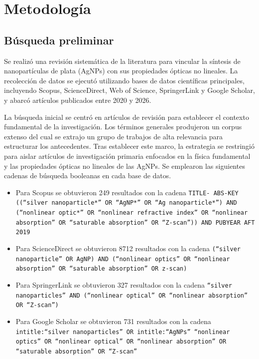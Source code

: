 \section{Metodología}

\subsection{Búsqueda preliminar}
Se realizó una revisión sistemática de la literatura para vincular la síntesis
de nanopartículas de plata (AgNPs) con sus propiedades ópticas no lineales.
La recolección de datos se ejecutó utilizando bases de datos científicas
principales, incluyendo Scopus, ScienceDirect, Web of Science, SpringerLink y
Google Scholar, y abarcó artículos publicados entre 2020 y 2026.

La búsqueda inicial se centró en artículos de revisión para establecer el
contexto fundamental de la investigación. Los términos generales produjeron un
corpus extenso del cual se extrajo un grupo de trabajos de alta relevancia para
estructurar los antecedentes. Tras establecer este marco, la estrategia se
restringió para aislar artículos de investigación primaria enfocados en la
física fundamental y las propiedades ópticas no lineales de las AgNPs. Se
emplearon las siguientes cadenas de búsqueda booleanas en cada base de datos.

\begin{itemize}
  \item Para Scopus se obtuvieron 249 resultados con la cadena \texttt{TITLE-
      ABS-KEY ((``silver nanoparticle*'' OR ``AgNP*'' OR ``Ag nanoparticle*'') AND
      (``nonlinear optic*'' OR ``nonlinear refractive index'' OR ``nonlinear
    absorption'' OR ``saturable absorption'' OR ``Z-scan'')) AND PUBYEAR AFT 2019}
  \item Para ScienceDirect se obtuvieron 8712 resultados con la cadena
    \texttt{(``silver nanoparticle'' OR AgNP) AND (``nonlinear optics'' OR
    ``nonlinear absorption'' OR ``saturable absorption'' OR z-scan)}
  \item Para SpringerLink se obtuvieron 327 resultados con la cadena
    \texttt{``silver nanoparticles'' AND (``nonlinear optical'' OR ``nonlinear
    absorption'' OR ``Z-scan'')}
  \item Para Google Scholar se obtuvieron 731 resultados con la cadena
    \texttt{intitle:``silver nanoparticles'' OR intitle:``AgNPs'' ``nonlinear
      optics'' OR ``nonlinear optical'' OR ``nonlinear absorption'' OR ``saturable
    absorption'' OR ``Z-scan''}
\end{itemize}

